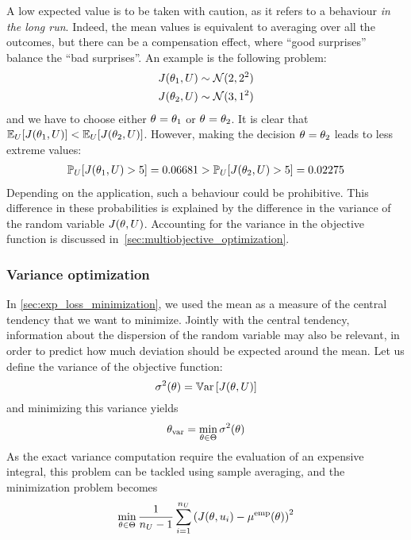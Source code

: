 \documentclass[../../Main_ManuscritThese.tex]{subfiles}
\begin{document}
A low expected value is to be taken with caution, as it refers to a
behaviour \emph{in the long run}. Indeed, the mean values is
equivalent to averaging over all the outcomes, but there can be a
compensation effect, where ``good surprises'' balance the ``bad
surprises''.  An example is the following problem:
\begin{align}
  J(\theta_1, U) &\sim \mathcal{N}(2, 2^2) \\
  J(\theta_2, U) & \sim \mathcal{N}(3, 1^2)
\end{align}
and we have to choose either ${\theta}_{\mathrm{}}=\theta_1$ or
${\theta}_{\mathrm{}} = \theta_2$.  It is clear that
$\mathbb{E}_{U}[J(\theta_1, U)] < \mathbb{E}_{U}[J(\theta_2, U)]$. However, making
the decision ${\theta}_{\mathrm{}} = \theta_2$ leads to less extreme values:
\begin{align}
  \mathbb{P}_{U}[J(\theta_1, U) > 5] = 0.06681> \mathbb{P}_{U}[J(\theta_2, U) > 5] = 0.02275
\end{align}
Depending on the application, such a behaviour could be prohibitive.
This difference in these probabilities is explained by the difference
in the variance of the random variable $J(\theta, U)$.  Accounting for
the variance in the objective function is discussed
in~\cref{sec:multiobjective_optimization}.

\subsubsection{Variance optimization}
In \cref{sec:exp_loss_minimization}, we used the mean as a measure of
the central tendency that we want to minimize. Jointly with the
central tendency, information about the dispersion of the random
variable may also be relevant, in order to predict how much deviation
should be expected around the mean.  Let us define the variance of the
objective function:
\begin{equation}
  \sigma^2(\theta) = \mathbb{V}\mathrm{ar}\left[J(\theta,U)\right]
\end{equation}
and minimizing this variance yields
\begin{equation}
  {\theta}_{\mathrm{var}} = \min_{\theta \in \Theta} \sigma^2(\theta)
\end{equation}
As the exact variance computation require the evaluation of an
expensive integral, this problem can be tackled using sample
averaging, and the minimization problem becomes
\begin{equation}
  \min_{\theta\in \Theta} \frac{1}{n_{U}-1} \sum_{i=1}^{n_{U}} \left(J(\theta, u_i) - \mu^{\mathrm{emp}}(\theta)\right)^2
\end{equation}
\end{document}
